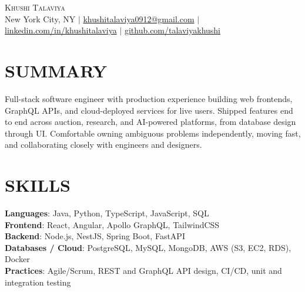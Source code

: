 \documentclass[letterpaper,11pt]{article}
\begin{document}
\begin{center}
    {\Huge \scshape Khushi Talaviya} \\ \vspace{2pt}
    \vspace{4pt}
    \small
    New York City, NY $|$
    \href{mailto:khushitalaviya0912@gmail.com}{khushitalaviya0912@gmail.com} $|$
    \href{https://www.linkedin.com/in/khushitalaviya/}{linkedin.com/in/khushitalaviya} $|$
    \href{https://github.com/talaviyakhushi}{github.com/talaviyakhushi}
\end{center}

\section{SUMMARY}
\vspace{5pt}
\small{Full-stack software engineer with production experience building web frontends, GraphQL APIs, and cloud-deployed services for live users. Shipped features end to end across auction, research, and AI-powered platforms, from database design through UI. Comfortable owning ambiguous problems independently, moving fast, and collaborating closely with engineers and designers.}

\vspace{2pt}
\section{SKILLS}
\vspace{5pt}
\begin{itemize}[leftmargin=0in, label={}]
\small{\item{
\textbf{Languages}{: Java, Python, TypeScript, JavaScript, SQL} \\
\textbf{Frontend}{: React, Angular, Apollo GraphQL, TailwindCSS} \\
\textbf{Backend}{: Node.js, NestJS, Spring Boot, FastAPI} \\
\textbf{Databases / Cloud}{: PostgreSQL, MySQL, MongoDB, AWS (S3, EC2, RDS), Docker} \\
\textbf{Practices}{: Agile/Scrum, REST and GraphQL API design, CI/CD, unit and integration testing}
}}
\end{itemize}
\vspace{-10pt}

\end{document}

